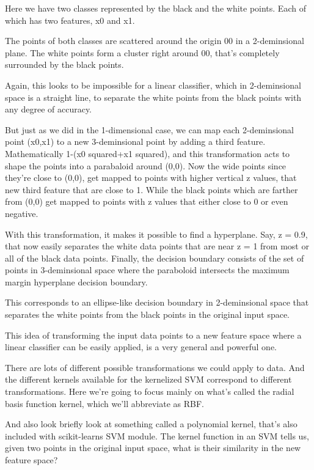 \begin{multicols}{2}
Here we have two classes represented by the black and the white points. Each of which has two features, x0 and x1. 

The points of both classes are scattered around the origin 00 in a 2-deminsional plane. The white points form a cluster right around 00, that's completely surrounded by the black points. 

Again, this looks to be impossible for a linear classifier, which in 2-deminsional space is a straight line, to separate the white points from the black points with any degree of accuracy. 

But just as we did in the 1-dimensional case, we can map each 2-deminsional point (x0,x1) to a new 3-deminsional point by adding a third feature. Mathematically 1-(x0 squared+x1 squared), and this transformation acts to shape the points into a parabaloid around (0,0). Now the wide points since they're close to (0,0), get mapped to points with higher vertical z values, that new third feature that are close to 1. While the black points which are farther from (0,0) get mapped to points with z values that either close to 0 or even negative. 

With this transformation, it makes it possible to find a hyperplane. Say, z = 0.9, that now easily separates the white data points that are near z = 1 from most or all of the black data points. Finally, the decision boundary consists of the set of points in 3-deminsional space where the paraboloid intersects the maximum margin hyperplane decision boundary. 

This corresponds to an ellipse-like decision boundary in 2-deminsional space that separates the white points from the black points in the original input space. 

This idea of transforming the input data points to a new feature space where a linear classifier can be easily applied, is a very general and powerful one. 

There are lots of different possible transformations we could apply to data. And the different kernels available for the kernelized SVM correspond to different transformations. Here we're going to focus mainly on what's called the radial basis function kernel, which we'll abbreviate as RBF. 

And also look briefly look at something called a polynomial kernel, that's also included with scikit-learns SVM module. The kernel function in an SVM tells us, given two points in the original input space, what is their similarity in the new feature space? 


\end{multicols}
